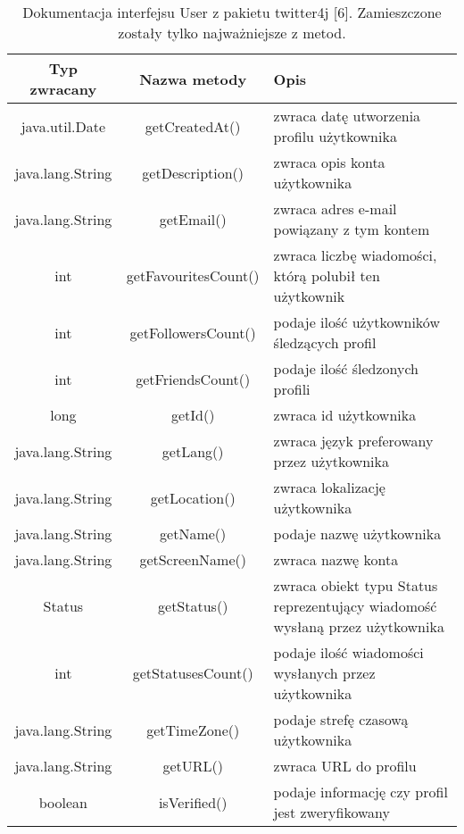 \begin{table}
\centering
\caption{Dokumentacja interfejsu User z pakietu twitter4j [6]. Zamieszczone zostały tylko najważniejsze z metod.}
\label{tab:table1}
\begin{tabularx}{\linewidth}{|c|c|X|}\toprule
    Typ zwracany & Nazwa metody & Opis \\ \midrule
    java.util.Date & getCreatedAt() & zwraca datę utworzenia profilu użytkownika \\ \midrule
    java.lang.String & getDescription() & zwraca opis konta użytkownika \\ \midrule
    java.lang.String & getEmail() & zwraca adres e-mail powiązany z tym kontem \\ \midrule
    int & getFavouritesCount() & zwraca liczbę wiadomości, którą polubił ten użytkownik \\ \midrule
    int & getFollowersCount() & podaje ilość użytkowników śledzących profil \\ \midrule
    int & getFriendsCount() & podaje ilość śledzonych profili \\ \midrule
    long & getId() & zwraca id użytkownika \\ \midrule
    java.lang.String & getLang() & zwraca język preferowany przez użytkownika \\ \midrule
    java.lang.String & getLocation() & zwraca lokalizację użytkownika \\ \midrule
    java.lang.String & getName() & podaje nazwę użytkownika \\ \midrule
    java.lang.String & getScreenName() & zwraca nazwę konta \\ \midrule
    Status & getStatus() & zwraca obiekt typu Status reprezentujący wiadomość wysłaną przez użytkownika \\ \midrule
    int & getStatusesCount() & podaje ilość wiadomości wysłanych przez użytkownika \\ \midrule
    java.lang.String & getTimeZone() & podaje strefę czasową użytkownika \\ \midrule
    java.lang.String & getURL() & zwraca URL do profilu \\ \midrule
    boolean & isVerified() & podaje informację czy profil jest zweryfikowany \\ \bottomrule 
\end{tabularx}
\end{table}

